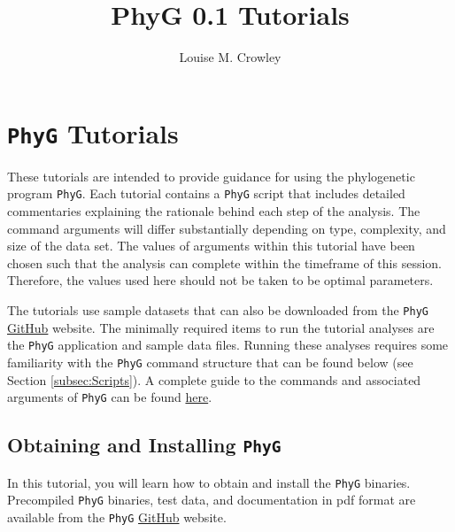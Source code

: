 \documentclass[]{article}
\title{PhyG 0.1 Tutorials}
\author{Louise M. Crowley}
\newcommand{\phyg}{\texttt{PhyG} }
\begin{document}
\maketitle

\pagestyle{fancy}


\section{\phyg Tutorials}

These tutorials are intended to provide guidance for using the phylogenetic 
program \texttt{PhyG}. Each tutorial contains a \phyg script that includes 
detailed commentaries explaining the rationale behind each step of the analysis. 
The command arguments will differ substantially depending on type, complexity, 
and size of the data set. The values of arguments within this tutorial have been 
chosen such that the analysis can complete within the timeframe of this session.
Therefore, the values used here should not be taken to be optimal parameters. 

The tutorials use sample datasets that can also be downloaded from the \texttt{PhyG} 
\href{https://github.com/amnh/PhyGraph}{GitHub} website. The minimally required 
items to run the tutorial analyses are the \phyg application and sample data files. 
Running these analyses requires some familiarity with the \phyg command structure 
that can be found below (see Section \ref{subsec:Scripts}). A complete guide to the
commands and associated arguments of \phyg can be found 
\href{https://github.com/amnh/PhyGraph}{here}.

\subsection{Obtaining and Installing \phyg}
\label{subsec:Installation}

In this tutorial, you will learn how to obtain and install the \phyg binaries.  
Precompiled \phyg binaries, test data, and documentation in pdf format are available 
from the \phyg \href{https://github.com/amnh/PhyGraph}{GitHub} website. 
\end{document}
